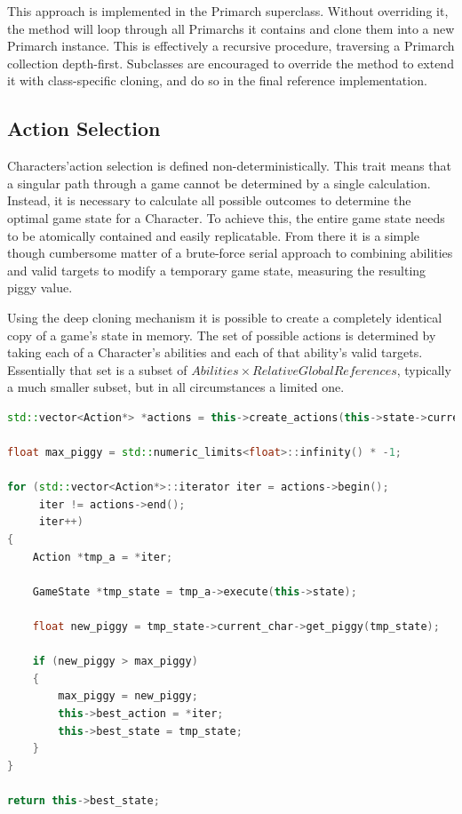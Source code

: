 This approach is implemented in the Primarch superclass. Without overriding it, the method will loop through all Primarchs it contains and clone them into a new Primarch instance. This is effectively a recursive procedure, traversing a Primarch collection depth-first. Subclasses are encouraged to override the method to extend it with class-specific cloning, and do so in the final reference implementation.

\subsection{Action Selection}
\label{actionselec}
Characters'action selection is defined non-deterministically. This trait means that a singular path through a game cannot be determined by a single calculation. Instead, it is necessary to calculate all possible outcomes to determine the optimal game state for a Character. To achieve this, the entire game state needs to be atomically contained and easily replicatable. From there it is a simple though cumbersome matter of a brute-force serial approach to combining abilities and valid targets to modify a temporary game state, measuring the resulting piggy value.

Using the deep cloning mechanism it is possible to create a completely identical copy of a game's state in memory. The set of possible actions is determined by taking each of a Character's abilities and each of that ability's valid targets. Essentially that set is a subset of $Abilities \times RelativeGlobalReferences$, typically a much smaller subset, but in all circumstances a limited one.

\begin{lstlisting}[language=C++]
std::vector<Action*> *actions = this->create_actions(this->state->current_char);

float max_piggy = std::numeric_limits<float>::infinity() * -1;

for (std::vector<Action*>::iterator iter = actions->begin();
     iter != actions->end();
     iter++)
{
    Action *tmp_a = *iter;

	GameState *tmp_state = tmp_a->execute(this->state);

	float new_piggy = tmp_state->current_char->get_piggy(tmp_state);

	if (new_piggy > max_piggy)
	{
		max_piggy = new_piggy;
		this->best_action = *iter;
		this->best_state = tmp_state;
	}
}

return this->best_state;
\end{lstlisting}

